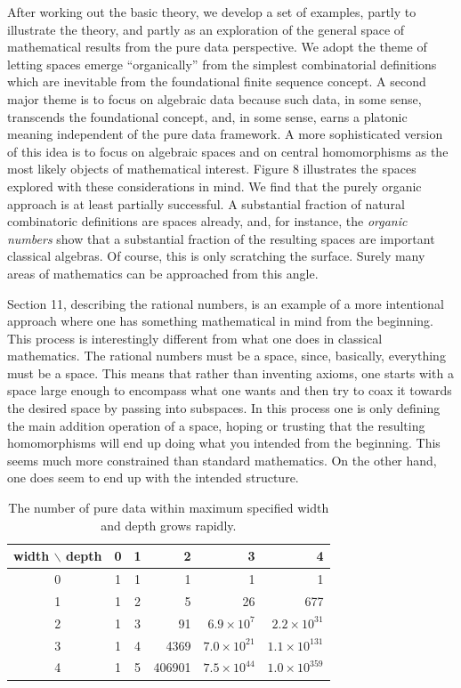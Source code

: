 \documentclass[11pt]{article}
\begin{document}
     After working out the basic theory, we develop a set of examples, partly to illustrate the theory, and partly as an exploration of the general 
space of mathematical results from the pure data perspective.  We adopt the theme of letting spaces emerge ``organically'' from the simplest 
combinatorial definitions which are inevitable from the foundational finite sequence concept.  
A second major theme is to focus on algebraic data because such data, in some sense, transcends 
the foundational concept, and, in some sense, earns a platonic meaning independent of the pure data framework.  A more 
sophisticated version of this idea is to focus on algebraic spaces and on central homomorphisms as the most likely objects 
of mathematical interest. 
Figure 8 illustrates the spaces explored with these considerations in mind.  
We find that the purely organic approach is at least partially successful.  A substantial fraction of natural combinatoric definitions are 
spaces already, and, for instance, the {\it organic numbers} show that a substantial fraction of the resulting spaces are important classical algebras.  Of course, this is only scratching the surface.  Surely many areas of mathematics can be approached from this angle.  

      Section 11, describing the rational numbers, is an example of a more intentional approach where one has something mathematical
in mind from the beginning.  This process is interestingly different from what one does in classical mathematics.  The rational numbers 
must be a space, since, basically, everything must be a space.  This means that rather than inventing axioms, one starts with a space 
large enough to encompass what one wants and then try to coax it towards the desired space by passing into subspaces.  In this 
process one is only defining the main addition operation of a space, hoping or trusting that the resulting homomorphisms will end up 
doing what you intended from the beginning.  This seems much more constrained than standard mathematics.  On the other hand, 
one does seem to end up with the intended structure.  
\begin{table}[h!]
\centering
\begin{tabular}{c|ccrrr}
\textbf{width} $\backslash$ \textbf{depth} & 0 & 1 & 2 & 3 & 4 \\
\hline
0 & 1 & 1 & 1 & 1 & 1 \\
1 & 1 & 2 & 5 & 26 & 677 \\
2 & 1 & 3 & 91 & $6.9\times 10^{7}$ & $2.2\times 10^{31}$ \\
3 & 1 & 4 & 4369 & $7.0\times 10^{21}$ & $1.1\times 10^{131}$ \\
4 & 1 & 5 & 406901 & $7.5\times 10^{44}$ & $1.0\times 10^{359}$ \\
\end{tabular}
\caption{The number of pure data within maximum specified width and depth grows rapidly.}
\label{tab:pure_data_counts}
\end{table}
\end{document}
